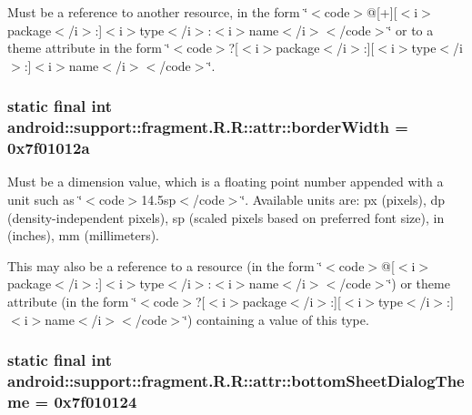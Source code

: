 Must be a reference to another resource, in the form \char`\"{}$<$code$>$@\mbox{[}+\mbox{]}\mbox{[}$<$i$>$package$<$/i$>$:\mbox{]}$<$i$>$type$<$/i$>$:$<$i$>$name$<$/i$>$$<$/code$>$\char`\"{} or to a theme attribute in the form \char`\"{}$<$code$>$?\mbox{[}$<$i$>$package$<$/i$>$:\mbox{]}\mbox{[}$<$i$>$type$<$/i$>$:\mbox{]}$<$i$>$name$<$/i$>$$<$/code$>$\char`\"{}. \hypertarget{classandroid_1_1support_1_1fragment_1_1_r_1_1attr_a0dd3840bce9eb5cfaff651ecb75f904}{
\subsubsection[{borderWidth}]{\setlength{\rightskip}{0pt plus 5cm}static final int android::support::fragment.R.R::attr::borderWidth = 0x7f01012a}}
\label{classandroid_1_1support_1_1fragment_1_1_r_1_1attr_a0dd3840bce9eb5cfaff651ecb75f904}


Must be a dimension value, which is a floating point number appended with a unit such as \char`\"{}$<$code$>$14.5sp$<$/code$>$\char`\"{}. Available units are: px (pixels), dp (density-independent pixels), sp (scaled pixels based on preferred font size), in (inches), mm (millimeters). 

This may also be a reference to a resource (in the form \char`\"{}$<$code$>$@\mbox{[}$<$i$>$package$<$/i$>$:\mbox{]}$<$i$>$type$<$/i$>$:$<$i$>$name$<$/i$>$$<$/code$>$\char`\"{}) or theme attribute (in the form \char`\"{}$<$code$>$?\mbox{[}$<$i$>$package$<$/i$>$:\mbox{]}\mbox{[}$<$i$>$type$<$/i$>$:\mbox{]}$<$i$>$name$<$/i$>$$<$/code$>$\char`\"{}) containing a value of this type. \hypertarget{classandroid_1_1support_1_1fragment_1_1_r_1_1attr_884db4d7798ddd61df781e70fa2e930b}{
\subsubsection[{bottomSheetDialogTheme}]{\setlength{\rightskip}{0pt plus 5cm}static final int android::support::fragment.R.R::attr::bottomSheetDialogTheme = 0x7f010124}}
\label{classandroid_1_1support_1_1fragment_1_1_r_1_1attr_884db4d7798ddd61df781e70fa2e930b}


